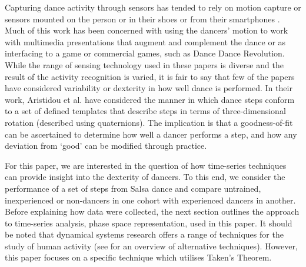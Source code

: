 \documentclass{sigchi}
\begin{document}
Capturing dance activity through sensors has tended to rely on motion capture 
\cite{Alexiadis2014} %
or sensors mounted on the person \cite{Lynch2005} %
or in their shoes \cite{Paradiso1997} %
or from their smartphones  \cite{Wei2014}. %
Much of this work has been concerned with using the dancers’ motion to work with 
multimedia presentations that augment and complement the dance \cite{Griffith1998, Park2006}
or as interfacing to a game \cite{Chu2012} %
or commercial games, such as Dance Dance Revolution.  
While the range of sensing technology used in these papers is diverse and the result of the activity 
recognition is varied, it is fair to say that few of the papers have considered 
variability or dexterity in how well dance is performed. 
In their work, Aristidou et al. \cite{Aristidou2014} %
have considered the manner in which dance steps conform to a set of defined 
templates that describe steps in terms of three-dimensional rotation (described using quaternions).  
The implication is that a goodness-of-fit can be ascertained to determine how well a dancer performs a step, 
and how any deviation from ‘good’ can be modified through practice. 

For this paper, we are interested in the question of how time-series techniques can provide insight into 
the dexterity of dancers. To this end, we consider the performance of a set of steps from Salsa dance and 
compare untrained, inexperienced or non-dancers in one cohort with experienced dancers in another. 
Before explaining how data were collected, the next section outlines the approach to time-series analysis,
phase space representation, used in this paper. 
It should be noted that dynamical systems research offers a range of techniques for the study of human activity 
(see \cite{Guastello2011} for an overview of alternative techniques). 
However, this paper focuses on a specific technique which utilises Taken's Theorem.
\end{document}
